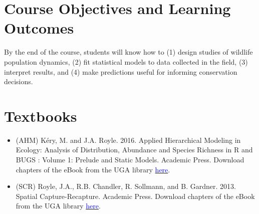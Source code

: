 \documentclass[12pt]{article}
\begin{document}
\vspace{-2mm}
\section*{\normalsize Course Objectives and Learning Outcomes}
\vspace{-4mm}
By the end of the course, students will know how to (1) design studies
of wildlife population dynamics, (2) fit statistical
models to data collected in the field, (3) interpret results, and (4)
make predictions useful for informing conservation decisions.  


\vspace{-2mm}
\section*{\normalsize Textbooks}
\vspace{-4mm}

\begin{itemize}
  \item (AHM) K\'ery, M. and J.A. Royle. 2016. Applied Hierarchical Modeling
    in Ecology: Analysis of Distribution, Abundance and Species Richness
    in R and BUGS : Volume 1: Prelude and Static Models. Academic Press.
    Download chapters of the eBook from the UGA library
        \href{http://eds.b.ebscohost.com/eds/detail/detail?vid=1&sid=23324ccb-5b1f-4eb6-b8b7-005232b9b48f%40pdc-v-sessmgr05&bdata=JnNpdGU9ZWRzLWxpdmU%3d#AN=1098832&db=nlebk}{\textcolor{blue}{here}}.
  \item (SCR) Royle, J.A., R.B. Chandler, R. Sollmann, and
    B. Gardner. 2013. Spatial Capture-Recapture. Academic Press.
    Download chapters of the eBook from the UGA library
        \href{http://eds.b.ebscohost.com/eds/detail/detail?vid=1&sid=44b8c9d7-8190-4990-8419-610cbd7b7fa9%40pdc-v-sessmgr01&bdata=JnNpdGU9ZWRzLWxpdmU%3d#AN=501310&db=nlebk}{\textcolor{blue}{here}}.
\end{itemize}

  

\vspace{-2mm}
\end{document}
